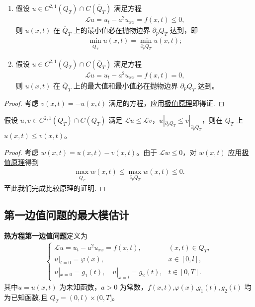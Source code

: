 \documentclass[../../main.tex]{subfiles}%
\begin{document}
\begin{corollary}
\begin{enumerate}[(1)]
\item 假设 $u\in C^{2,1}(Q_T)\cap C(\overline{Q}_T)$ 满足方程
\begin{align*}
\mathcal{L}u=u_t-a^2u_{xx}=f(x,t)\leqslant 0,
\end{align*}
则 $u(x,t)$ 在 $\overline{Q}_T$ 上的最小值必在抛物边界 $\partial_p Q_T$ 达到，即
\begin{align*}
\min_{\overline{Q}_T}u(x,t)=\min_{\partial_p Q_T}u(x,t);
\end{align*}

\item 假设 $u\in C^{2,1}(Q_T)\cap C(\overline{Q}_T)$ 满足方程
\begin{align*}
\mathcal{L}u=u_t-a^2u_{xx}=f(x,t) = 0,
\end{align*}
则 $u(x,t)$ 在 $\overline{Q}_T$ 上的最大值和最小值必在抛物边界 $\partial_p Q_T$ 达到。
\end{enumerate}
\end{corollary}
\begin{proof}
考虑 $v(x,t)=-u(x,t)$ 满足的方程，应用\hyperref[theorem:PDE极值原理]{极值原理}即得证.
\end{proof}

\begin{corollary}[比较原理]\label{corollary:PDE比较原理}
假设 $u,v\in C^{2,1}(Q_T)\cap C(\overline{Q}_T)$ 满足 $\mathcal{L}u\leqslant \mathcal{L}v$，$u|_{\partial_p Q_T}\leqslant v|_{\partial_p Q_T}$，则在 $\overline{Q}_T$ 上 $u(x,t)\leqslant v(x,t)$。
\end{corollary}
\begin{proof}
考虑 $w(x,t)=u(x,t)-v(x,t)$。由于 $\mathcal{L}w\leqslant 0$，对 $w(x,t)$ 应用\hyperref[theorem:PDE极值原理]{极值原理}得到
\begin{align*}
\max_{\overline{Q}_T}w(x,t)\leqslant \max_{\partial_p Q_T}w(x,t)\leqslant 0.
\end{align*}
至此我们完成比较原理的证明.
\end{proof}

\subsection{第一边值问题的最大模估计}

\begin{definition}[热方程第一边值问题]
\textbf{热方程第一边值问题}定义为
\begin{align}
\begin{cases}
\mathcal{L}u=u_t-a^2u_{xx}=f(x,t), & (x,t)\in Q_T,\\
u|_{t=0}=\varphi(x), & x\in[0,l],\\
u|_{x=0}=g_1(t),\quad u|_{x=l}=g_2(t), & t\in[0,T].
\end{cases} \label{eq:heat-dirichlet-max}
\end{align}
其中$u=u(x,t)$ 为未知函数，$a>0$ 为常数，$f(x,t)$,$\varphi(x)$,$g_1(t),g_2(t)$ 均为已知函数,且 $Q_T=(0,l)\times(0,T]$。
\end{definition}
\end{document}
